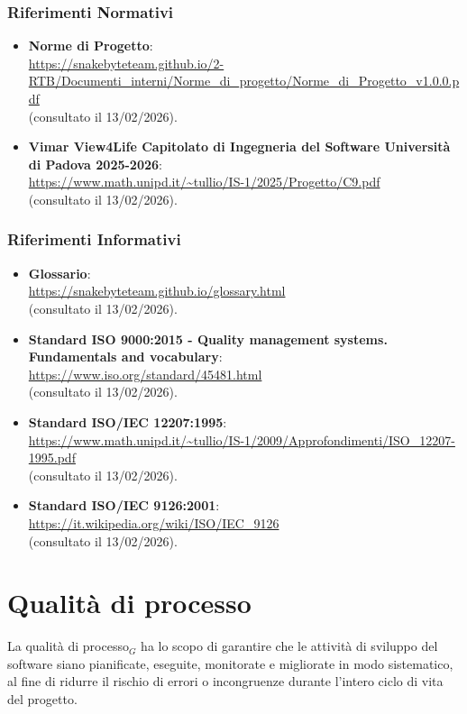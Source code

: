 \documentclass[10pt, letterpaper]{article}
\begin{document}
\subsubsection{Riferimenti Normativi}
\begin{itemize}
    \item \textbf{Norme di Progetto}:
          \\ \url{https://snakebyteteam.github.io/2-RTB/Documenti_interni/Norme_di_progetto/Norme_di_Progetto_v1.0.0.pdf}
          \\ (consultato il 13/02/2026).
    \item \textbf{Vimar View4Life Capitolato di Ingegneria del Software Università di Padova 2025-2026}:
          \\ \url{https://www.math.unipd.it/~tullio/IS-1/2025/Progetto/C9.pdf}
          \\ (consultato il 13/02/2026).
\end{itemize}
\subsubsection{Riferimenti Informativi}
\begin{itemize}
    \item \textbf{Glossario}:
          \\ \url{https://snakebyteteam.github.io/glossary.html}
          \\ (consultato il 13/02/2026).
    \item \textbf{Standard ISO 9000:2015 - Quality management systems. Fundamentals and vocabulary}:
          \\ \url{https://www.iso.org/standard/45481.html}
          \\ (consultato il 13/02/2026).
    \item \textbf{Standard ISO/IEC 12207:1995}:
          \\ \url{https://www.math.unipd.it/~tullio/IS-1/2009/Approfondimenti/ISO_12207-1995.pdf}
          \\ (consultato il 13/02/2026).
    \item \textbf{Standard ISO/IEC 9126:2001}:
          \\ \url{https://it.wikipedia.org/wiki/ISO/IEC_9126}
          \\ (consultato il 13/02/2026).
\end{itemize}

\section{Qualità di processo}
La qualità di processo${_G}$ ha lo scopo di garantire che le attività di sviluppo
del software siano pianificate, eseguite, monitorate e migliorate in modo
sistematico, al fine di ridurre il rischio di errori o incongruenze
durante l'intero ciclo di vita del progetto.
\end{document}
